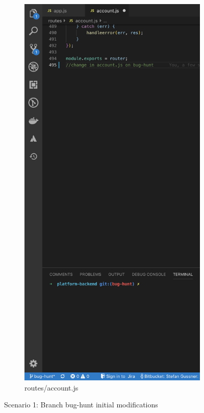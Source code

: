 \begin{figure}[h]
\begin{subfigure}{.5\textwidth}
        \includegraphics[width=1\linewidth]{figures/screenshots/scenarios/1accountjs_on_bughunt.png}
        \caption{routes/account.js}
        \label{fig:1account_on_bughunt}
    \end{subfigure}
    \caption{Scenario 1: Branch bug-hunt initial modifications}
\end{figure}

